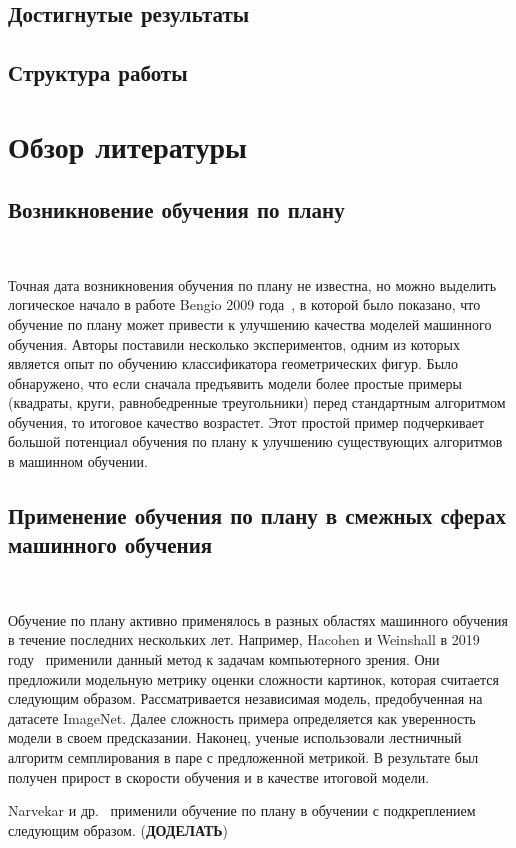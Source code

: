 \documentclass{spbau-diploma}
\begin{document}
\subsection*{Достигнутые результаты}
\subsection*{Структура работы}
\section{Обзор литературы}
\subsection{Возникновение обучения по плану}
\ 

Точная дата возникновения обучения по плану не известна, но можно выделить логическое начало в работе Bengio 2009 года~\cite{bengio2009curriculum}, в которой было показано, что обучение по плану может привести к улучшению качества моделей машинного обучения. Авторы поставили несколько экспериментов, одним из которых является опыт по обучению классификатора геометрических фигур. Было обнаружено, что если сначала предъявить модели более простые примеры (квадраты, круги, равнобедренные треугольники) перед стандартным алгоритмом обучения, то итоговое качество возрастет. Этот простой пример подчеркивает большой потенциал обучения по плану к улучшению существующих алгоритмов в машинном обучении.
\subsection{Применение обучения по плану в смежных сферах машинного обучения}
\ 

Обучение по плану активно применялось в разных областях машинного обучения в течение последних нескольких лет. Например, Hacohen и Weinshall в 2019 году~\cite{hacohen2019power} применили данный метод к задачам компьютерного зрения. Они предложили модельную метрику оценки сложности картинок, которая считается следующим образом. Рассматривается независимая модель, предобученная на датасете ImageNet. Далее сложность примера определяется как уверенность модели в своем предсказании. Наконец, ученые использовали лестничный алгоритм семплирования в паре с предложенной метрикой. В результате был получен прирост в скорости обучения и в качестве итоговой модели.

Narvekar и др.~\cite{narvekar2020curriculum} применили обучение по плану в обучении с подкреплением следующим образом. ({\bf ДОДЕЛАТЬ})
\end{document}
